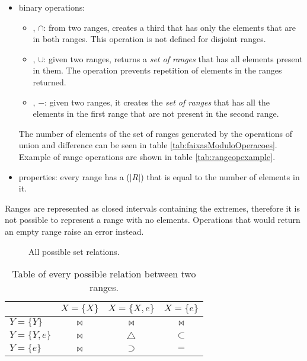 \begin{itemize}
	\item binary operations:
		\begin{itemize}
			\item {}, $\cap$: from two ranges,
				creates a third that has only the elements that are in both
				ranges. This operation is not defined for disjoint ranges.
			\item {}, $\cup$: given two ranges, returns a
				\emph{set of ranges} that has all elements present in them.
				The operation prevents repetition of elements in the
				ranges returned.
			\item {}, $-$: given two ranges, it
				creates the \emph{set of ranges} that has all the elements in
				the first range that are not present in the second range.
		\end{itemize}
		The number of elements of the set of ranges generated by the operations
		of union and difference can be seen in table
		\ref{tab:faixasModuloOperacoes}. Example of range operations are shown
		in table \ref{tab:rangeopexample}.
	\item properties: every range has a
		 ($|R|$) that is equal to the number of
		elements in it.
\end{itemize}

Ranges are represented as closed intervals containing the extremes, therefore it
is not possible to represent a range with no elements. Operations that would
return an empty range raise an error instead.


\begin{figure}
	\caption{\label{fig:conjuntos}All possible set relations.}
\end{figure}

\begin{table}
	\centering
	\caption{\label{tab:faixasRelacoes} Table of every possible relation between
	two ranges.}
	\begin{tabular}{l|ccc}
		&             $X=\{X\}$ & $X=\{X,e\}$     & $X=\{e\}$ \\
		\hline
		$Y=\{Y\}$   & $\bowtie$ & $\bowtie$       & $\bowtie$ \\
		$Y=\{Y,e\}$ & $\bowtie$ & $\triangle$     & $\subset$ \\
		$Y=\{e\}$   & $\bowtie$ & $\supset$       & $=$ \\
	\end{tabular}
\end{table}


